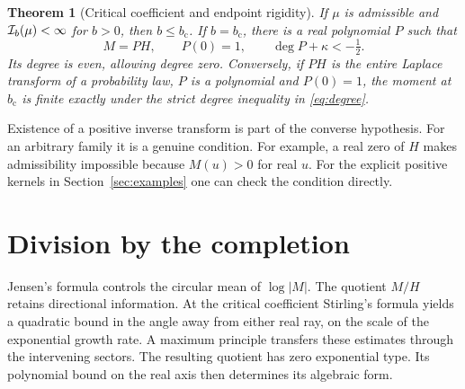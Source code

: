\documentclass[11pt,letterpaper]{article}
\newtheorem{theorem}{Theorem}[section]
\newcommand{\bcrit}{b_{\mathrm c}}
\begin{document}
\begin{theorem}[Critical coefficient and endpoint rigidity]\label{thm:main}
If $\mu$ is admissible and $\mathcal I_b(\mu)<\infty$ for $b>0$, then $b\le\bcrit$. If $b=\bcrit$, there is a real polynomial $P$ such that
\begin{equation}
 M=PH,\qquad P(0)=1,\qquad \deg P+\kappa<-\tfrac12 . \label{eq:degree}
\end{equation}
Its degree is even, allowing degree zero. Conversely, if $PH$ is the entire Laplace transform of a probability law, $P$ is a polynomial and $P(0)=1$, the moment at $\bcrit$ is finite exactly under the strict degree inequality in \eqref{eq:degree}.
\end{theorem}
Existence of a positive inverse transform is part of the converse hypothesis. For an arbitrary family it is a genuine condition. For example, a real zero of $H$ makes admissibility impossible because $M(u)>0$ for real $u$. For the explicit positive kernels in Section~\ref{sec:examples} one can check the condition directly.

\section{Division by the completion}
Jensen's formula controls the circular mean of $\log|M|$. The quotient $M/H$ retains directional information. At the critical coefficient Stirling's formula yields a quadratic bound in the angle away from either real ray, on the scale of the exponential growth rate. A maximum principle transfers these estimates through the intervening sectors. The resulting quotient has zero exponential type. Its polynomial bound on the real axis then determines its algebraic form.
\end{document}

